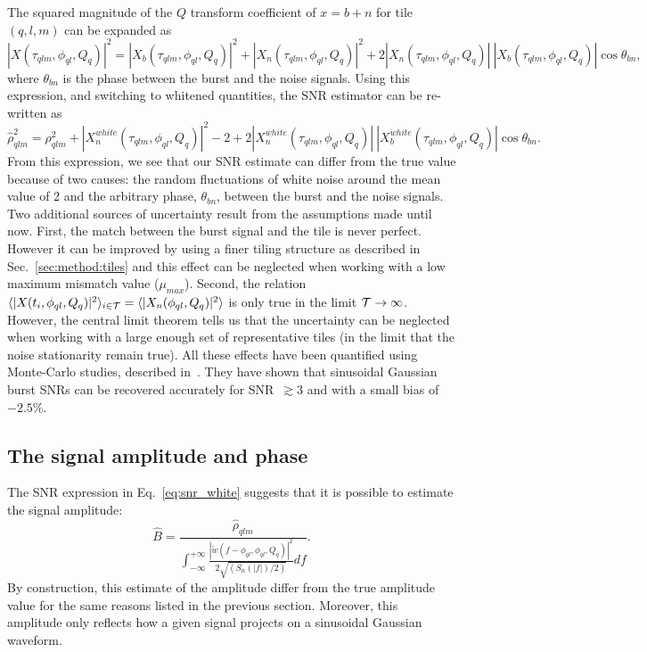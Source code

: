The squared magnitude of the $Q$ transform coefficient of $x=b+n$ for tile $(q,l,m)$ can be expanded as
\begin{equation}
  |X(\tau_{qlm}, \phi_{ql}, Q_q)|^2 = |X_b(\tau_{qlm}, \phi_{ql}, Q_q)|^2 + |X_n(\tau_{qlm}, \phi_{ql}, Q_q)|^2 + 2|X_n(\tau_{qlm}, \phi_{ql}, Q_q)|\ |X_b(\tau_{qlm}, \phi_{ql}, Q_q)|\cos{\theta_{bn}},
\end{equation}
where $\theta_{bn}$ is the phase between the burst and the noise signals. Using this expression, and switching to whitened quantities, the SNR estimator can be re-written as
\begin{equation}
  \hat{\rho}_{qlm}^2  =
  \rho_{qlm}^2
  + |X^{white}_n(\tau_{qlm}, \phi_{ql}, Q_q)|^2 -2
  + 2|X^{white}_n(\tau_{qlm}, \phi_{ql}, Q_q)|\ |X^{white}_b(\tau_{qlm}, \phi_{ql}, Q_q)| \cos{\theta_{bn}}.
\end{equation}
From this expression, we see that our SNR estimate can differ from the true value because of two causes: the random fluctuations of white noise around the mean value of 2 and the arbitrary phase, $\theta_{bn}$, between the burst and the noise signals. Two additional sources of uncertainty result from the assumptions made until now. First, the match between the burst signal and the tile is never perfect. However it can be improved by using a finer tiling structure as described in Sec.~\ref{sec:method:tiles} and this effect can be neglected when working with a low maximum mismatch value ($\mu_{max}$). Second, the relation $\langle |X(t_i, \phi_{ql}, Q_q)|^2 \rangle_{i\in \cal{T}}=\langle |X_n(\phi_{ql}, Q_q)|^2 \rangle$ is only true in the limit $\cal{T}\rightarrow \infty$. However, the central limit theorem tells us that the uncertainty can be neglected when working with a large enough set of representative tiles (in the limit that the noise stationarity remain true). All these effects have been quantified using Monte-Carlo studies, described in~\cite{Chatterji:2004}. They have shown that sinusoidal Gaussian burst SNRs can be recovered accurately for SNR~$\gtrsim 3$ and with a small bias of $-2.5\%$. 


\subsection{The signal amplitude and phase} \label{sec:method:ampphase}

The SNR expression in Eq.~\ref{eq:snr_white} suggests that it is possible to estimate the signal amplitude:
\begin{equation}
  \hat{B} = \frac{\hat{\rho}_{qlm}}{\int_{-\infty}^{+\infty}{\frac{|\tilde{w}(f-\phi_{ql},\phi_{ql},Q_q)|^2}{2\sqrt{(S_n(|f|)/2)}}df}}.
  \label{eq:amplitude}
\end{equation}
By construction, this estimate of the amplitude differ from the true amplitude value for the same reasons listed in the previous section. Moreover, this amplitude only reflects how a given signal projects on a sinusoidal Gaussian waveform.

